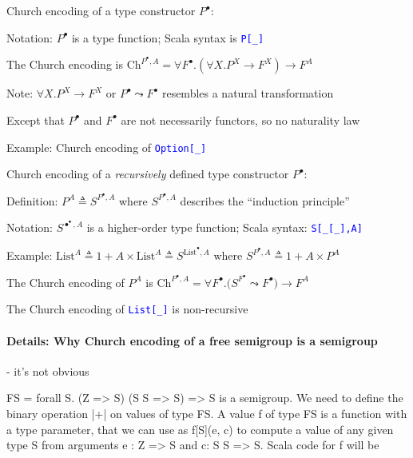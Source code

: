 Church encoding of a type constructor $P^{\bullet}$:

Notation: $P^{\bullet}$ is a type function; Scala syntax is \texttt{\textcolor{blue}{\footnotesize{}P{[}\_{]}}} 

The Church encoding is {\footnotesize{}$\text{Ch}^{P^{\bullet},A}=\forall F^{\bullet}.\left(\forall X.P^{X}\rightarrow F^{X}\right)\rightarrow F^{A}$}{\footnotesize\par}

Note: $\forall X.P^{X}\rightarrow F^{X}$ or $P^{\bullet}\leadsto F^{\bullet}$
resembles a natural transformation

Except that $P^{\bullet}$ and $F^{\bullet}$ are not necessarily
functors, so no naturality law

Example: Church encoding of \texttt{\textcolor{blue}{\footnotesize{}Option{[}\_{]}}} 

Church encoding of a \emph{recursively} defined type constructor $P^{\bullet}$:

Definition: $P^{A}\triangleq S^{P^{\bullet},A}$ where $S^{P^{\bullet},A}$
describes the \textsf{``}induction principle\textsf{''}

Notation: {\footnotesize{}$S^{\bullet^{\bullet},A}$} is a higher-order
type function; Scala syntax: \texttt{\textcolor{blue}{\footnotesize{}S{[}\_{[}\_{]},A{]}}} 

Example: $\text{List}^{A}\triangleq1+A\times\text{List}^{A}\triangleq S^{\text{List}^{\bullet},A}$
where $S^{P^{\bullet},A}\triangleq1+A\times P^{A}$ 

The Church encoding of $P^{A}$ is {\footnotesize{}$\text{Ch}^{P^{\bullet},A}=\forall F^{\bullet}.\big(S^{F^{\bullet}}\leadsto F^{\bullet}\big)\rightarrow F^{A}$}{\footnotesize\par}

The Church encoding of \texttt{\textcolor{blue}{\footnotesize{}List{[}\_{]}}}
is non-recursive

\paragraph{Details: Why Church encoding of a free semigroup is a semigroup}

- it\textsf{'}s not obvious

FS = forall S. (Z => S) \texttimes{} (S \texttimes{} S => S) => S
is a semigroup.  We need to define the binary operation |+| on values
of type FS. A value f of type FS is a function with a type parameter,
that we can use as f{[}S{]}(e, c) to compute a value of any given
type S from arguments e : Z => S and c: S \texttimes{} S => S. Scala
code for f will be

